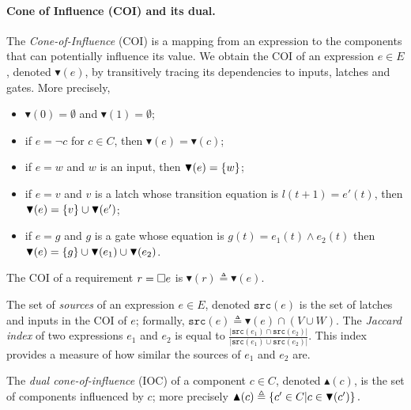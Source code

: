 \paragraph{Cone of Influence (COI) and its dual.}
The \emph{Cone-of-Influence} (COI) is a mapping from an expression to the components that can potentially influence its value. We obtain the COI of an expression $e \in E$, denoted $\blacktriangledown(e)$, by transitively tracing its dependencies to inputs, latches and gates. More precisely, 
\begin{itemize}
\item $\blacktriangledown(0)=\emptyset$ and $\blacktriangledown(1)=\emptyset$;
\item if $e=\lnot c$ for $c \in C$, then $\blacktriangledown(e)= \blacktriangledown(c)$;
\item if $e=w$ and $w$ is an input, then $\blacktriangledown(e)=\left\{w\right\}$;
\item if $e=v$ and $v$ is a latch whose transition equation is $l(t+1) = e'(t)$, then $\blacktriangledown(e)=\left\{v\right\} \cup \blacktriangledown(e')$;
\item if $e=g$ and $g$ is a gate whose equation is $g(t) = e_1(t) \land e_2(t)$ then $\blacktriangledown(e)=\left\{g\right\} \cup \blacktriangledown(e_1)\cup \blacktriangledown(e_2)$.
\end{itemize}
The COI of a requirement $r={{\square}} e$ is $\blacktriangledown(r)\triangleq \blacktriangledown(e)$.

The set of \emph{sources} of an expression $e\in E$, denoted $\mathtt{src}(e)$ is the set of latches and inputs in the COI of $e$; formally, $\mathtt{src}(e)\triangleq \blacktriangledown(e) \cap (V \cup W)$. The \emph{Jaccard index} of two expressions $e_1$ and $e_2$ is equal to $
\frac{|\mathtt{src}(e_1)\cap \mathtt{src}(e_2)|}{|\mathtt{src}(e_1)\cup\mathtt{src}(e_2)|}
$. This index provides a measure of how similar the sources of $e_1$ and $e_2$ are. 

The \emph{dual cone-of-influence} (IOC) of a component $c \in C$, denoted $\blacktriangle(c)$, is the set of components influenced by $c$; more precisely 
$\blacktriangle(c) \triangleq \left\{c' \in  C | c\in \blacktriangledown(c')\right\}.$

